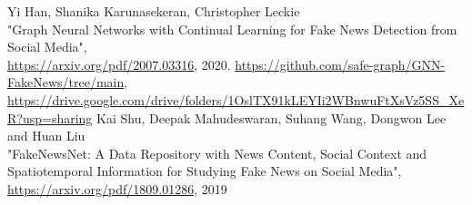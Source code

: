 \documentclass[11pt,a4paper]{article}
\begin{document}
\begin{thebibliography}{9}
	 Yi Han, Shanika Karunasekeran, Christopher Leckie\\"Graph Neural Networks with Continual Learning for Fake News Detection from Social Media",\\ \url{https://arxiv.org/pdf/2007.03316}, 2020.
	 \url{https://github.com/safe-graph/GNN-FakeNews/tree/main},\\\url{https://drive.google.com/drive/folders/1OslTX91kLEYIi2WBnwuFtXsVz5SS_XeR?usp=sharing}
	 Kai Shu, Deepak Mahudeswaran, Suhang Wang, Dongwon Lee and Huan Liu\\"FakeNewsNet: A Data Repository with News Content, Social Context and Spatiotemporal Information for Studying Fake News on Social Media",\\ \url{https://arxiv.org/pdf/1809.01286}, 2019
\end{thebibliography}
\end{document}
